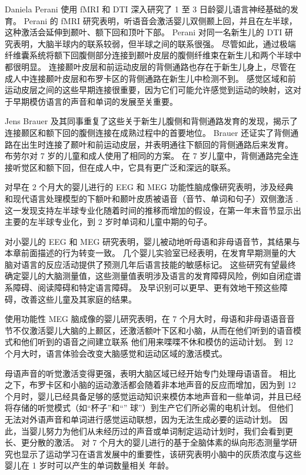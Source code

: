 Daniela Perani 使用 fMRI 和 DTI 深入研究了 1 至 3 日龄婴儿语言神经基础的发育。 Perani 的 fMRI 研究表明，听语音会激活婴儿双侧颞上回，并且在左半球，这种激活会延伸到颞叶、额下回和顶叶下部。 Perani 对同一名新生儿的 DTI 研究表明，大脑半球内的联系较弱，但半球之间的联系很强。 尽管如此，通过极端纤维囊系统将额下回腹侧部分连接到颞叶皮层的腹侧纤维束在新生儿和两个半球中都很明显。 连接颞叶皮层和前运动皮层的背侧通路也存在于新生儿身上，尽管在成人中连接颞叶皮层和布罗卡区的背侧通路在新生儿中检测不到。 感觉区域和前运动皮层之间的这些早期连接很重要，因为它们可能允许感觉到运动的映射，这对于早期模仿语言的声音和单词的发展至关重要。

Jens Brauer 及其同事重复了这些关于新生儿腹侧和背侧通路发育的发现，揭示了连接颞区和额下回的腹侧连接在成熟过程中的首要地位。 Brauer 还证实了背侧通路在出生时连接了颞叶和前运动皮层，并表明通往下额回的背侧通路后来发育。 布劳尔对 7 岁的儿童和成人使用了相同的方案。 在 7 岁儿童中，背侧通路完全连接听觉区和额下回，但在成人中，它具有更广泛和深远的联系。

对早在 2 个月大的婴儿进行的 EEG 和 MEG 功能性脑成像研究表明，涉及经典和现代语言处理模型的下额叶和颞叶皮质被语音（音节、单词和句子）双侧激活 . 这一发现支持左半球专业化随着时间的推移而增加的假设，在第一年末音节显示出主要的左半球专业化，到 2 岁时单词和儿童中期的句子。

对小婴儿的 EEG 和 MEG 研究表明，婴儿被动地听母语和非母语音节，其结果与本章前面描述的行为转变一致。 几个婴儿实验室已经表明，在发育早期测量的大脑对语言的反应活动提供了预测几年后语言技能的敏感标记。 这些研究有望最终确定婴儿的大脑测量值，这些测量值表明涉及语言的发育障碍风险，例如自闭症谱系障碍、阅读障碍和特定语言障碍。 及早识别可以更早、更有效地干预这些障碍，改善这些儿童及其家庭的结果。

使用功能性 MEG 脑成像的婴儿研究表明，在 7 个月大时，母语和非母语语音音节不仅激活婴儿大脑的上颞区，还激活额叶下区和小脑，从而在他们听到的语音模式和他们听到的语音之间建立联系 他们用来喋喋不休和模仿的运动计划。 到 12 个月大时，语言体验会改变大脑感觉和运动区域的激活模式。

母语声音的听觉激活变得更强，表明大脑区域已经开始专门处理母语语音。 相比之下，布罗卡区和小脑的运动激活都会随着非本地声音的反应而增加，因为到 12 个月时，婴儿已经具备足够的感觉运动知识来模仿本地声音和一些单词，并且已经将存储的听觉模式（如“杯子”和“” 球”）到生产它们所必需的电机计划。 但他们无法对外语声音和单词进行感觉运动联想，因为无法生成必要的运动计划。 因此，当婴儿努力为他们从未经历过的声音或单词制定运动计划时，我们会看到更长、更分散的激活。 对 7 个月大的婴儿进行的基于全脑体素的纵向形态测量学研究也显示了运动学习在语言发展中的重要性，该研究表明小脑中的灰质浓度与这些婴儿在 1 岁时可以产生的单词数量相关 年龄。

